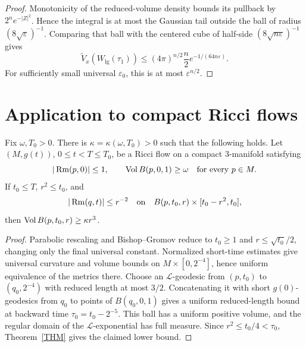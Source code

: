 \begin{proof}
\sketch
{}
Monotonicity of the reduced-volume density bounds its pullback by
$2^ne^{-|Z|^2}$. Hence the integral is at most the Gaussian tail outside the
ball of radius $(8\sqrt\varepsilon)^{-1}$. Comparing that ball with the
centered cube of half-side $(8\sqrt{n\varepsilon})^{-1}$ gives
\[
  \widetilde V_x(W_{\mathrm{lg}}(\tau_1))
  \leq(4\pi)^{n/2}\frac n2
  e^{-1/(64n\varepsilon)}.
\]
For sufficiently small universal $\varepsilon_0$, this is at most
$\varepsilon^{n/2}$.
\end{proof}

\section{Application to compact Ricci flows}

\begin{theorem}
\label{thm:kappa-noncollapsed-compact-3-manifolds}

Fix $\omega,T_0>0$. There is $\kappa=\kappa(\omega,T_0)>0$ such that
the following holds. Let $(M,g(t))$, $0\leq t<T\leq T_0$, be a Ricci flow
on a compact $3$-manifold satisfying
\[
  |\operatorname{Rm}(p,0)|\leq1,
  \qquad
  \operatorname{Vol} B(p,0,1)\geq\omega
  \quad\text{for every }p\in M.
\]
If $t_0\leq T$, $r^2\leq t_0$, and
\[
  |\operatorname{Rm}(q,t)|\leq r^{-2}
  \quad\text{on}\quad
  B(p,t_0,r)\times[t_0-r^2,t_0],
\]
then
$\operatorname{Vol} B(p,t_0,r)\geq\kappa r^3$.
\end{theorem}

\begin{proof}
\sketch
{}
Parabolic rescaling and Bishop--Gromov reduce to
$t_0\geq1$ and $r\leq\sqrt{t_0}/2$, changing only the final universal
constant. Normalized short-time estimates give universal curvature and volume
bounds on $M\times[0,2^{-4}]$, hence uniform equivalence of the metrics there.
Choose an $\mathcal L$-geodesic from $(p,t_0)$ to
$(q_0,2^{-4})$ with reduced length at most $3/2$. Concatenating it with
short $g(0)$-geodesics from $q_0$ to points of $B(q_0,0,1)$ gives a uniform
reduced-length bound at backward time
$\tau_0=t_0-2^{-5}$. This ball has a uniform positive volume, and the regular
domain of the $\mathcal L$-exponential has full measure. Since
$r^2\leq t_0/4<\tau_0$, Theorem~\ref{THM} gives the claimed lower bound.
\end{proof}
